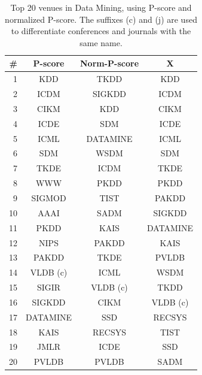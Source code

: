 \begin{table}[htbp]
\centering
\caption{Top 20 venues in Data Mining, using P-score and normalized P-score. The suffixes (c) and (j) are used to differentiate conferences and journals with the same name.}
\label{tab:db-venues}
\begin{tabular}{rccc}
    \toprule
\#		&		P-score		&		Norm-P-score&		X			\\ \hline
1		&		KDD			&		TKDD		&		KDD			\\
2		&		ICDM		&		SIGKDD		&		ICDM		\\
3		&		CIKM		&		KDD			&		CIKM		\\
4		&		ICDE		&		SDM			&		ICDE		\\
5		&		ICML		&		DATAMINE	&		ICML		\\
6		&		SDM			&		WSDM		&		SDM			\\
7		&		TKDE		&		ICDM		&		TKDE		\\
8		&		WWW			&		PKDD		&		PKDD		\\
9		&		SIGMOD		&		TIST		&		PAKDD		\\
10		&		AAAI		&		SADM		&		SIGKDD		\\
11		&		PKDD		&		KAIS		&		DATAMINE	\\
12		&		NIPS		&		PAKDD		&		KAIS		\\
13		&		PAKDD		&		TKDE		&		PVLDB		\\
14		&		VLDB (c)	&		ICML		&		WSDM		\\
15		&		SIGIR		&		VLDB (c)	&		TKDD		\\
16		&		SIGKDD		&		CIKM		&		VLDB (c)	\\
17		&		DATAMINE	&		SSD			&		RECSYS		\\
18		&		KAIS		&		RECSYS		&		TIST		\\
19		&		JMLR		&		ICDE		&		SSD			\\
20		&		PVLDB		&		PVLDB		&		SADM		\\
\bottomrule


\end{tabular}
\end{table}
